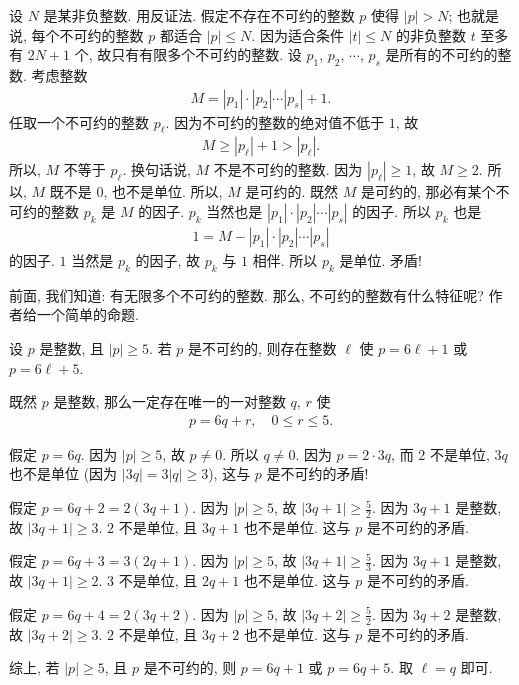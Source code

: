 \begin{pf}
    设 $N$ 是某非负整数. 用反证法. 假定不存在不可约的整数 $p$ 使得 $|p| > N$; 也就是说, 每个不可约的整数 $p$ 都适合 $|p| \leq N$. 因为适合条件 $|t| \leq N$ 的非负整数 $t$ 至多有 $2N + 1$ 个, 故只有有限多个不可约的整数. 设 $p_1$, $p_2$, $\cdots$, $p_s$ 是所有的不可约的整数. 考虑整数
    \begin{align*}
        M = |p_1| \cdot |p_2| \cdots |p_s| + 1.
    \end{align*}
    任取一个不可约的整数 $p_\ell$. 因为不可约的整数的绝对值不低于 $1$, 故
    \begin{align*}
        M \geq |p_\ell| + 1 > |p_\ell|.
    \end{align*}
    所以, $M$ 不等于 $p_\ell$. 换句话说, $M$ 不是不可约的整数. 因为 $|p_\ell| \geq 1$, 故 $M \geq 2$. 所以, $M$ 既不是 $0$, 也不是单位. 所以, $M$ 是可约的. 既然 $M$ 是可约的, 那必有某个不可约的整数 $p_k$ 是 $M$ 的因子. $p_k$ 当然也是 $|p_1| \cdot |p_2| \cdots |p_s|$ 的因子. 所以 $p_k$ 也是
    \begin{align*}
        1 = M - |p_1| \cdot |p_2| \cdots |p_s|
    \end{align*}
    的因子. $1$ 当然是 $p_k$ 的因子, 故 $p_k$ 与 $1$ 相伴. 所以 $p_k$ 是单位. 矛盾!
\end{pf}

前面, 我们知道: 有无限多个不可约的整数. 那么, 不可约的整数有什么特征呢? 作者给一个简单的命题.

\begin{proposition}
    设 $p$ 是整数, 且 $|p| \geq 5$. 若 $p$ 是不可约的, 则存在整数 $\ell$ 使 $p = 6\ell + 1$ 或 $p = 6\ell + 5$.
\end{proposition}

\begin{pf}
    既然 $p$ 是整数, 那么一定存在唯一的一对整数 $q$, $r$ 使
    \begin{align*}
        p = 6q + r, \quad 0 \leq r \leq 5.
    \end{align*}

    假定 $p = 6q$. 因为 $|p| \geq 5$, 故 $p \neq 0$. 所以 $q \neq 0$. 因为 $p = 2 \cdot 3q$, 而 $2$ 不是单位, $3q$ 也不是单位 (因为 $|3q| = 3|q| \geq 3$), 这与 $p$ 是不可约的矛盾!

    假定 $p = 6q + 2 = 2(3q + 1)$. 因为 $|p| \geq 5$, 故 $|3q + 1| \geq \frac{5}{2}$. 因为 $3q + 1$ 是整数, 故 $|3q + 1| \geq 3$. $2$ 不是单位, 且 $3q + 1$ 也不是单位. 这与 $p$ 是不可约的矛盾.

    假定 $p = 6q + 3 = 3(2q + 1)$. 因为 $|p| \geq 5$, 故 $|3q + 1| \geq \frac{5}{3}$. 因为 $3q + 1$ 是整数, 故 $|3q + 1| \geq 2$. $3$ 不是单位, 且 $2q + 1$ 也不是单位. 这与 $p$ 是不可约的矛盾.

    假定 $p = 6q + 4 = 2(3q + 2)$. 因为 $|p| \geq 5$, 故 $|3q + 2| \geq \frac{5}{2}$. 因为 $3q + 2$ 是整数, 故 $|3q + 2| \geq 3$. $2$ 不是单位, 且 $3q + 2$ 也不是单位. 这与 $p$ 是不可约的矛盾.

    综上, 若 $|p| \geq 5$, 且 $p$ 是不可约的, 则 $p = 6q + 1$ 或 $p = 6q + 5$. 取 $\ell = q$ 即可.
\end{pf}

